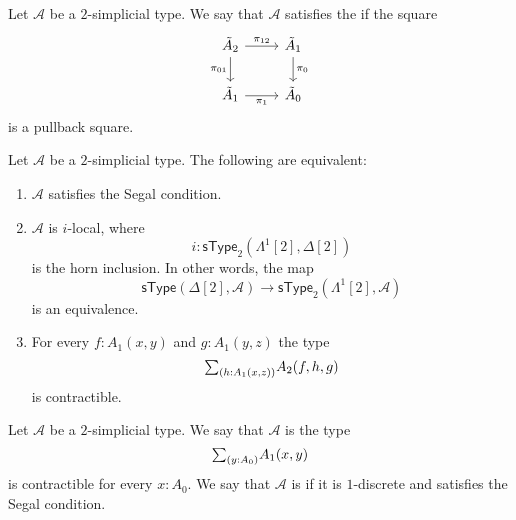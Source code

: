 \begin{defn}
Let $\mathcal{A}$ be a $2$-simplicial type. We say that $\mathcal{A}$ satisfies the  if the square
\begin{equation*}
\begin{tikzcd}
\tilde{A}_2 \arrow[r,"\pi_{12}"] \arrow[d,swap,"\pi_{01}"] & \tilde{A}_1 \arrow[d,"\pi_0"] \\
\tilde{A}_1 \arrow[r,swap,"\pi_1"] & \tilde{A}_0
\end{tikzcd}
\end{equation*}
is a pullback square.
\end{defn}

\begin{thm}
Let $\mathcal{A}$ be a $2$-simplicial type. The following are equivalent:
\begin{enumerate}
\item $\mathcal{A}$ satisfies the Segal condition.
\item $\mathcal{A}$ is $i$-local, where
\begin{equation*}
i : \mathsf{sType}_2(\Lambda^1[2],\Delta[2])
\end{equation*}
is the horn inclusion. In other words, the map
\begin{equation*}
\mathsf{sType}(\Delta[2],\mathcal{A}) \to \mathsf{sType}_2(\Lambda^1[2],\mathcal{A})
\end{equation*}
is an equivalence.
\item For every $f:A_1(x,y)$ and $g:A_1(y,z)$ the type
\begin{equation*}
\sm{h:A_1(x,z)}A_2(f,h,g)
\end{equation*}
is contractible.
\end{enumerate}
\end{thm}

\begin{defn}
Let $\mathcal{A}$ be a $2$-simplicial type. We say that $\mathcal{A}$ is  the type
\begin{equation*}
\sm{y:A_0}A_1(x,y)
\end{equation*}
is contractible for every $x:A_0$. We say that $\mathcal{A}$ is  if it is $1$-discrete and satisfies the Segal condition. 
\end{defn}

